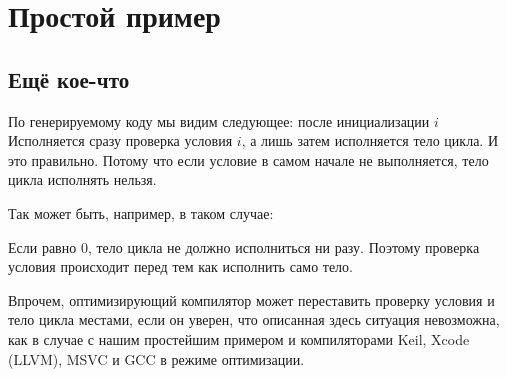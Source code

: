 \section{Простой пример}


\ifdefined\IncludeARM

\fi
\ifdefined\IncludeMIPS

\fi

\subsection{Ещё кое-что}

По генерируемому коду мы видим следующее: после инициализации $i$%
Исполняется сразу проверка условия $i$, а лишь затем исполняется тело цикла.
И это правильно. 
Потому что если условие в самом начале не выполняется, тело цикла исполнять нельзя.

Так может быть, например, в таком случае:



Если  равно 0,
тело цикла не должно исполниться ни разу.
Поэтому проверка условия происходит перед тем как исполнить само тело.

Впрочем, оптимизирующий компилятор может переставить проверку условия и тело цикла местами, если он уверен,
что описанная здесь ситуация невозможна, как в случае с нашим простейшим примером и компиляторами 
Keil, Xcode (LLVM), MSVC и GCC в режиме оптимизации.

